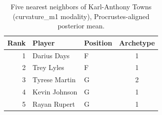 \begin{table}[htbp]
  \centering\small
  \begin{tabular}{rllc}
    \toprule
    Rank & Player & Position & Archetype \\
    \midrule
    1 & Darius Days & F & 1 \\
    2 & Trey Lyles & F & 1 \\
    3 & Tyrese Martin & G & 2 \\
    4 & Kevin Johnson & G & 1 \\
    5 & Rayan Rupert & G & 1 \\
    \bottomrule
  \end{tabular}
  \caption{Five nearest neighbors of Karl-Anthony Towns (curvature_m1 modality), Procrustes-aligned posterior mean.}
  \label{tab:Karl_Anthony_Towns_neighbors_curvature_m1}
\end{table}


